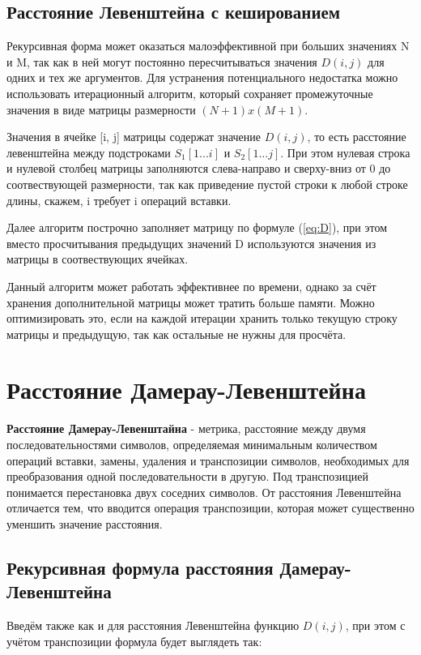 \subsection{Расстояние Левенштейна с кешированием}
Рекурсивная форма может оказаться малоэффективной при больших значениях N и M, так как в ней могут постоянно пересчитываться значения $D(i, j)$ для одних и тех же аргументов. Для устранения потенциального недостатка можно использовать итерационный алгоритм, который сохраняет промежуточные значения в виде матрицы размерности $(N+1)x(M+1)$.

Значения в ячейке [i, j] матрицы содержат значение $D(i, j)$, то есть расстояние левенштейна между подстроками $S_1[1...i]$ и $S_2[1...j]$.
При этом нулевая строка и нулевой столбец матрицы заполняются слева-направо и сверху-вниз от 0 до соотвествующей размерности,  так как приведение пустой строки к любой строке длины, скажем, i требует i операций вставки.

Далее алгоритм построчно заполняет матрицу по формуле (\ref{eq:D}), при этом вместо просчитывания предыдущих значений D используются значения из матрицы в соотвествующих ячейках.

Данный алгоритм может работать эффективнее по времени, однако за счёт хранения дополнительной матрицы может тратить больше памяти. Можно оптимизировать это, если на каждой итерации хранить только текущую строку матрицы и предыдущую, так как остальные не нужны для просчёта.

\section{Расстояние Дамерау-Левенштейна}

\textbf{Расстояние Дамерау-Левенштайна} - метрика, расстояние между двумя последовательностями символов, определяемая минимальным количеством операций вставки, замены, удаления и транспозиции символов, необходимых для преобразования одной последовательности в другую. Под транспозицией понимается перестановка двух соседних символов. От расстояния Левенштейна отличается тем, что вводится операция транспозиции, которая может существенно уменшить значение расстояния.

\subsection{Рекурсивная формула расстояния Дамерау-Левенштейна}

Введём также как и для расстояния Левенштейна функцию $D(i, j)$, при этом с учётом транспозиции формула будет выглядеть так:

